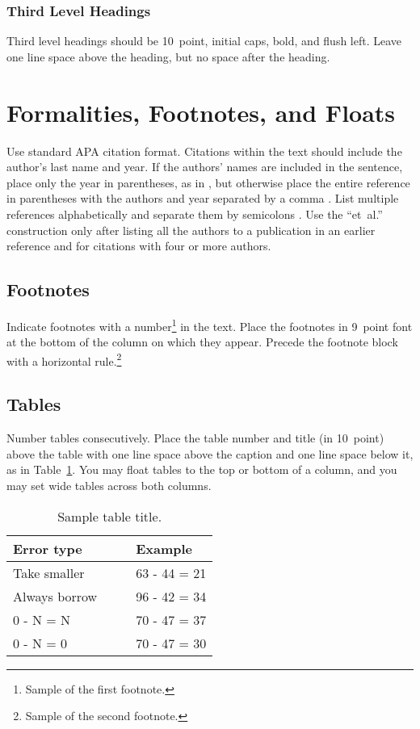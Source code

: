 \documentclass[10pt,letterpaper]{article}
\begin{document}
\subsubsection{Third Level Headings}

Third level headings should be 10~point, initial caps, bold, and flush
left. Leave one line space above the heading, but no space after the
heading.


\section{Formalities, Footnotes, and Floats}

Use standard APA citation format. Citations within the text should
include the author's last name and year. If the authors' names are
included in the sentence, place only the year in parentheses, as in
, but otherwise place the entire reference in
parentheses with the authors and year separated by a comma
\cite{NewellSimon1972a}. List multiple references alphabetically and
separate them by semicolons
\cite{ChalnickBillman1988a,NewellSimon1972a}. Use the
``et~al.'' construction only after listing all the authors to a
publication in an earlier reference and for citations with four or
more authors.


\subsection{Footnotes}

Indicate footnotes with a number\footnote{Sample of the first
footnote.} in the text. Place the footnotes in 9~point font at the
bottom of the column on which they appear. Precede the footnote block
with a horizontal rule.\footnote{Sample of the second footnote.}


\subsection{Tables}

Number tables consecutively. Place the table number and title (in
10~point) above the table with one line space above the caption and
one line space below it, as in Table~\ref{sample-table}. You may float
tables to the top or bottom of a column, and you may set wide tables across
both columns.

\begin{table}[H]
\begin{center} 
\caption{Sample table title.} 
\label{sample-table} 
\vskip 0.12in
\begin{tabular}{ll} 
\hline
Error type    &  Example \\
\hline
Take smaller        &   63 - 44 = 21 \\
Always borrow~~~~   &   96 - 42 = 34 \\
0 - N = N           &   70 - 47 = 37 \\
0 - N = 0           &   70 - 47 = 30 \\
\hline
\end{tabular} 
\end{center} 
\end{table}
\end{document}
